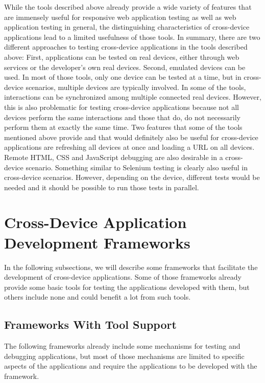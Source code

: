While the tools described above already provide a wide variety of features that are immensely useful for responsive web application testing as well as web application testing in general, the distinguishing characteristics of cross-device applications lead to a limited usefulness of those tools. In summary, there are two different approaches to testing cross-device applications in the tools described above: First, applications can be tested on real devices, either through web services or the developer's own real devices. Second, emulated devices can be used. In most of those tools, only one device can be tested at a time, but in cross-device scenarios, multiple devices are typically involved. In some of the tools, interactions can be synchronized among multiple connected real devices. However, this is also problematic for testing cross-device applications because not all devices perform the same interactions and those that do, do not necessarily perform them at exactly the same time. Two features that some of the tools mentioned above provide and that would definitely also be useful for cross-device applications are refreshing all devices at once and loading a URL on all devices. Remote HTML, CSS and JavaScript debugging are also desirable in a cross-device scenario. Something similar to Selenium testing is clearly also useful in cross-device scenarios. However, depending on the device, different tests would be needed and it should be possible to run those tests in parallel.

\section{Cross-Device Application Development Frameworks}

In the following subsections, we will describe some frameworks that facilitate the development of cross-device applications. Some of those frameworks already provide some basic tools for testing the applications developed with them, but others include none and could benefit a lot from such tools.

\subsection{Frameworks With Tool Support}

The following frameworks already include some mechanisms for testing and debugging applications, but most of those mechanisms are limited to specific aspects of the applications and require the applications to be developed with the framework.

